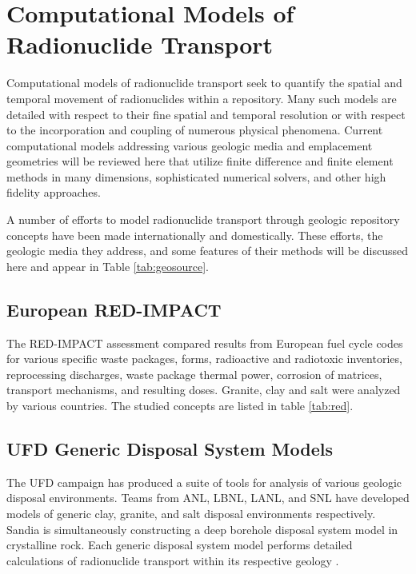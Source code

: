 \section{Computational Models of Radionuclide Transport}
\label{sec:detailed_radionuclide}

Computational models of radionuclide transport seek to quantify the 
spatial and temporal movement of radionuclides within a repository. Many such models are detailed 
with respect to their fine spatial and temporal resolution or with respect to 
the incorporation and coupling of numerous physical phenomena. Current 
computational models addressing various geologic media and emplacement 
geometries will be reviewed here that utilize finite difference and finite 
element methods in many dimensions, sophisticated numerical solvers, and other 
high fidelity approaches.

A number of efforts to model radionuclide transport through geologic repository 
concepts have been made internationally and domestically. These efforts, the 
geologic media they address, and  some features of their methods will be 
discussed here and appear in Table \ref{tab:geosource}.



\subsection{European RED-IMPACT} 

The RED-IMPACT assessment compared
results from European fuel cycle codes for various specific waste packages, 
forms, radioactive and radiotoxic inventories, reprocessing discharges,  waste
package thermal power, corrosion of matrices, transport mechanisms, and
resulting doses.  Granite, clay and salt were analyzed by various countries. 
The studied concepts are listed in table \ref{tab:red}.







\subsection{UFD Generic Disposal System Models}

The \gls{UFD} campaign has produced a suite of tools for analysis of various 
geologic disposal environments. 
Teams from \acrlong{ANL}, \acrlong{LBNL}, \acrlong{LANL}, and \acrlong{SNL} have 
developed
models of generic clay, granite, and salt disposal environments respectively. Sandia is
simultaneously constructing a deep borehole disposal system model in crystalline 
rock. Each generic disposal system model performs detailed calculations of 
radionuclide transport within its respective geology 
\cite{clayton_generic_2011}. 

